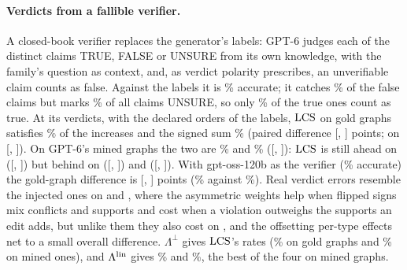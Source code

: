 \paragraph{Verdicts from a fallible verifier.} A closed-book verifier replaces the generator's labels:
GPT-6 judges each of the \vfGptClaims{} distinct claims TRUE, FALSE or UNSURE from its own knowledge,
with the family's question as context, and, as verdict polarity prescribes, an unverifiable claim
counts as false. Against the labels it is \vfGptAcc\% accurate; it catches \vfGptFalseRecall\% of the
false claims but marks \vfGptUnsure\% of all claims UNSURE, so only \vfGptTrueRecall\% of the true
ones count as true. At its verdicts, with the declared orders of the labels, $\mathrm{LCS}$ on gold graphs
satisfies \vfGptGoldLcsInc\% of the increases and the signed sum \vfGptGoldWsumInc\% (paired
difference [\vfGptGoldDiffloInc, \vfGptGoldDiffhiInc] points; on 
[\vfGptGoldDiffloConflict, \vfGptGoldDiffhiConflict]). On GPT-6's mined graphs the two are
\vfGptMinedLcsInc\% and \vfGptMinedWsumInc\% ([\vfGptMinedDiffloInc, \vfGptMinedDiffhiInc]): $\mathrm{LCS}$
is still ahead on  ([\vfGptMinedDiffloConflict, \vfGptMinedDiffhiConflict]) but behind on
 ([\vfGptMinedDiffloChain, \vfGptMinedDiffhiChain]) and 
([\vfGptMinedDiffloSign, \vfGptMinedDiffhiSign]). With gpt-oss-120b as the verifier (\vfOssAcc\% accurate) the gold-graph
difference is [\vfOssGoldDiffloInc, \vfOssGoldDiffhiInc] points (\vfOssGoldLcsInc\% against
\vfOssGoldWsumInc\%). Real verdict errors resemble the injected ones on  and , where the asymmetric
weights help when flipped signs mix conflicts and supports and cost when a violation outweighs the
supports an edit adds, but unlike them they also cost on , and the offsetting per-type
effects net to a small overall difference. $\Lambda^{\perp}$ gives $\mathrm{LCS}$'s rates (\vfGptGoldIndepInc\%
on gold graphs and \vfGptMinedIndepInc\% on mined ones), and $\Lambda^{\mathrm{lin}}$ gives \vfGptGoldLinInc\% and
\vfGptMinedLinInc\%, the best of the four on mined graphs.

